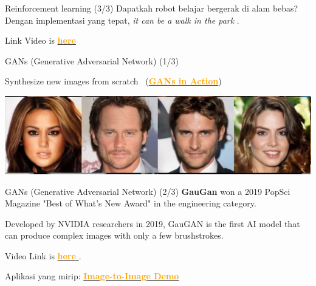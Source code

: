 \documentclass[pdf]{beamer}
\theoremstyle{mystyle}
\begin{document}
\begin{frame}{Reinforcement learning (3/3)}
	Dapatkah robot belajar bergerak di alam bebas? \\
	Dengan implementasi yang tepat, \textit{it can be a walk in the park} \citep{smith2022awalk}.
	
	\bigskip
	Link Video is \href{https://drive.google.com/file/d/1UE8JdqxJxpUn9McbEbfnRQXDLV9Pkmwl/view?usp=sharing}{\textcolor{orange}{\textbf{here}}}
\end{frame}

\begin{frame}{GANs (Generative Adversarial Network) (1/3)}
	\begin{center}
		Synthesize new images from scratch~\citep{karras2017progressive} (\href{https://drive.google.com/file/d/12kyeMlwG7geHo3WzO9wOo00n53LBOvpj/view?usp=sharing}{\textcolor{orange}{\textbf{GANs in Action}}})
	\end{center}
	\begin{center}
		\includegraphics[scale=.25]{GANs}
	\end{center}			
\end{frame}

\begin{frame}{GANs (Generative Adversarial Network) (2/3)}
	\textbf{GauGan} won a 2019 PopSci Magazine "Best of What's New Award" in the engineering category.
	
	\bigskip
	Developed by NVIDIA researchers in 2019, GauGAN is the first AI model that can produce complex images with only a few brushstrokes. 
	
	\bigskip
	Video Link is \href{https://twitter.com/NVIDIAAIDev/status/1201907407242153986}{\textcolor{orange}{\textbf{here}} }.
	
	\bigskip
	Aplikasi yang mirip: \href{https://affinelayer.com/pixsrv/?utm_source=pocket_reader}{\textcolor{orange}{\textbf{Image-to-Image Demo}}}	
\end{frame}
\end{document}
